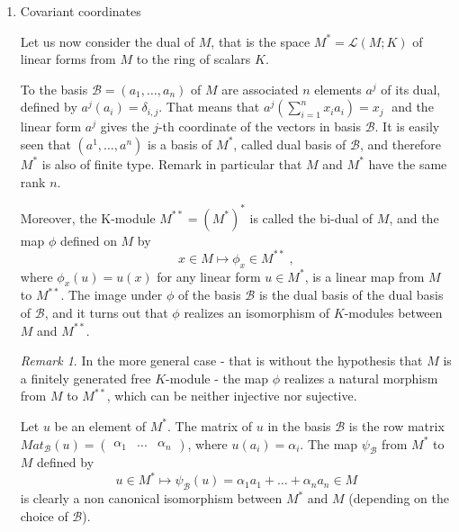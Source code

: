 \documentclass{report}
\theoremstyle{definition}
\theoremstyle{remark}
\newtheorem{remark}{Remark}
\begin{document}
\begin{enumerate}
    \item Covariant coordinates

Let us now consider the dual of $M$, that is the space $M^*=\mathcal{L}(M;K)$  of linear forms from $M$ to the ring of scalars $K$. 

To the basis $\mathcal{B}=(a_1,\dots,a_n)$ of $M$ are associated $n$ elements $a ^j$ of its dual, defined by $a ^j(a_i)=\delta_{i,j}$. That means that $a ^j(\sum_{i=1}^{n} x_ia_i)=x_j\;$ and the linear form $a^j$ gives the $j$-th coordinate of the vectors in basis $\mathcal{B}$. It is easily seen that $(a^1,\dots, a^n)$ is a basis of $M^*$, called dual basis of $\mathcal{B}$, and therefore $M^*$ is also of finite type. Remark in particular that $M$ and $M^*$ have the same rank $n$.

\medskip
Moreover, the K-module $M^{**}=(M^*)^*$ is called the bi-dual of $M$, and the map $\phi$ defined on $M$ by $$x \in M \mapsto  \phi _x \in M^{**}\;,$$ where $\phi _x(u)=u(x)$ for any linear form $u \in M^*$, is a linear map from $M$ to $M^{**}$. The image under $\phi$ of the basis $\mathcal{B}$ is the dual basis of the dual basis of $\mathcal{B}$, and it turns out that $\phi$ realizes an isomorphism of $K$-modules between $M$ and $M^{**}$.
\medskip
\begin{remark} \label{the map phi}
    In the more general case - that is without the hypothesis that $M$ is a finitely generated free $K$-module - the map $\phi$ realizes a natural morphism from $M$ to $M^{**}$, which can be neither injective nor sujective.
\end{remark} 
\medskip
Let $u$ be an element of $M^*$. The matrix of $u$ in the basis $\mathcal{B}$ is the row matrix $Mat_{\mathcal{B}}(u)=\begin{pmatrix}\alpha_1&...&\alpha_n\end{pmatrix}$, where $u(a_i)=\alpha _i$. The map $\psi_{\mathcal{B}}$ from $M^*$ to $M$ defined by
$$u \in M^* \mapsto  \psi_{\mathcal{B}}(u)=\alpha_1a_1+\dots+\alpha_na_n \in M$$ is clearly a non canonical isomorphism between $M^*$ and $M$ (depending on the choice of $\mathcal{B}$). 


\end{enumerate}
\end{document}
